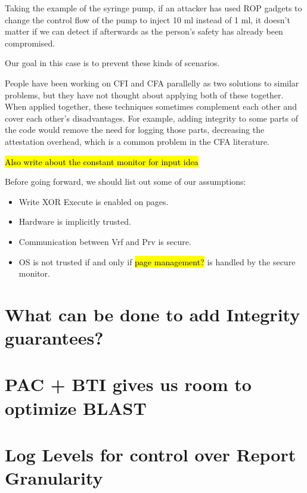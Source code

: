 \documentclass[a4paper, nobind]{templates/ociamthesis}
\providecommand{\tightlist}{%
  \setlength{\itemsep}{0pt}\setlength{\parskip}{0pt}}
\begin{document}
Taking the example of the syringe pump, if an attacker has used ROP gadgets to
change the control flow of the pump to inject 10 ml instead of 1 ml, it doesn't
matter if we can detect if afterwards as the person's safety has already been compromised.

Our goal in this case is to prevent these kinds of scenarios.

People have been working on CFI and CFA parallelly as two solutions to similar
problems, but they have not thought about applying both of these together.
When applied together, these techniques sometimes complement each other and cover
each other's disadvantages. For example, adding integrity to some parts of the
code would remove the need for logging those parts, decreasing the attestation
overhead, which is a common problem in the CFA literature.

\hl{Also write about the constant monitor for input idea}

Before going forward, we should list out some of our assumptions:

\begin{itemize}
\tightlist
\item
  Write XOR Execute is enabled on pages.
\item
  Hardware is implicitly trusted.
\item
  Communication between Vrf and Prv is secure.
\item
  OS is not trusted if and only if \hl{page management?} is handled
  by the secure monitor.
\end{itemize}

\section{What can be done to add Integrity guarantees?}\label{what-can-be-done-to-add-integrity-guarantees}

\section{PAC + BTI gives us room to optimize BLAST}\label{pac-bti-gives-us-room-to-optimize-blast}

\section{Log Levels for control over Report Granularity}\label{log-levels-for-control-over-report-granularity}
\end{document}

